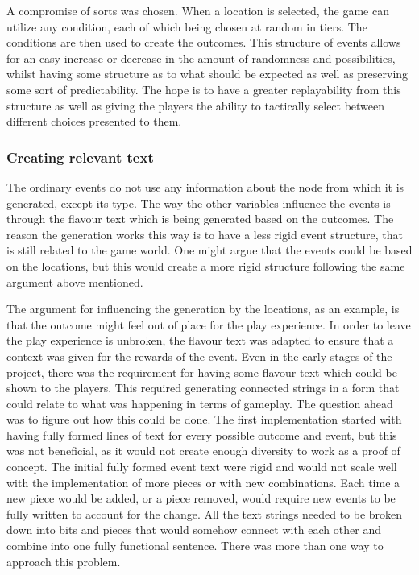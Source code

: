 A compromise of sorts was chosen. When a location is selected, the game can utilize any condition, each of which being chosen at random in tiers. The conditions are then used to create the outcomes. This structure of events allows for an easy increase or decrease in the amount of randomness and possibilities, whilst having some structure as to what should be expected as well as preserving some sort of predictability. The hope is to have a greater replayability from this structure as well as giving the players the ability to tactically select between different choices presented to them.

\subsubsection{Creating relevant text}
The ordinary events do not use any information about the node from which it is generated, except its type. The way the other variables influence the events is through the flavour text which is being generated based on the outcomes. The reason the generation works this way is to have a less rigid event structure, that is still related to the game world.
One might argue that the events could be based on the locations, but this would create a more rigid structure following the same argument above mentioned. 

The argument for influencing the generation by the locations, as an example, is that the outcome might feel out of place for the play experience. In order to leave the play experience is unbroken, the flavour text was adapted to ensure that a context was given for the rewards of the event. Even in the early stages of the project, there was the requirement for having some flavour text which could be shown to the players. This required generating connected strings in a form that could relate to what was happening in terms of gameplay. The question ahead was to figure out how this could be done. The first implementation started with having fully formed lines of text for every possible outcome and event, but this was not beneficial, as it would not create enough diversity to work as a proof of concept. The initial fully formed event text were rigid and would not scale well with the implementation of more pieces or with new combinations. Each time a new piece would be added, or a piece removed, would require new events to be fully written to account for the change. All the text strings needed to be broken down into bits and pieces that would somehow connect with each other and combine into one fully functional sentence. There was more than one way to approach this problem.

